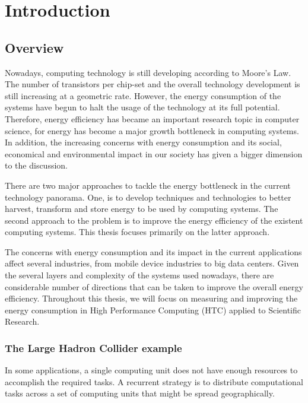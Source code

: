 \chapter{Introduction}

\section{Overview}
Nowadays, computing technology is still developing according to Moore's Law. The number of transistors per
chip-set and the overall technology development is still increasing at a geometric rate. However, the energy
consumption of the systems have begun to halt the usage of the technology at its
full potential. Therefore, energy efficiency has became an important
research topic in computer science, for energy has become a major growth
bottleneck in computing systems. In addition, the increasing concerns with energy consumption and
its social, economical and environmental impact in our society has given a
bigger dimension to the discussion.


There are two major approaches to tackle the energy bottleneck in the current
technology panorama. One, is to develop techniques and technologies to better harvest, 
transform and store energy to be used by computing systems. The second approach to the problem is to improve the energy efficiency of the existent computing systems. This thesis focuses primarily on the latter approach. 

The concerns with energy consumption and its impact in the current
applications affect several industries, from mobile device industries to big data centers. 
Given the several layers and complexity of the systems used nowadays, there are 
considerable number of directions that can be taken to improve the overall energy efficiency. Throughout this thesis, we will focus on measuring and improving the energy
consumption in High Performance Computing (HTC) applied to Scientific Research.


\subsection*{The Large Hadron Collider example}
In some applications, a single computing unit does not have enough resources to
accomplish the required tasks. A recurrent strategy is to distribute computational tasks
across a set of computing units that might be spread geographically.

